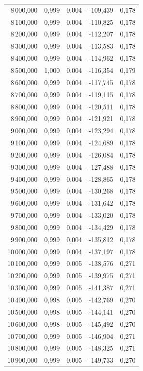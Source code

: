 \begin{longtable}{rrrrr}
8\,000,000 & 0,999 & 0,004 & -109,439 & 0,178\\
8\,100,000 & 0,999 & 0,004 & -110,825 & 0,178\\
8\,200,000 & 0,999 & 0,004 & -112,207 & 0,178\\
8\,300,000 & 0,999 & 0,004 & -113,583 & 0,178\\
8\,400,000 & 0,999 & 0,004 & -114,962 & 0,178\\
8\,500,000 & 1,000 & 0,004 & -116,354 & 0,179\\
8\,600,000 & 0,999 & 0,004 & -117,745 & 0,178\\
8\,700,000 & 0,999 & 0,004 & -119,115 & 0,178\\
8\,800,000 & 0,999 & 0,004 & -120,511 & 0,178\\
8\,900,000 & 0,999 & 0,004 & -121,921 & 0,178\\
9\,000,000 & 0,999 & 0,004 & -123,294 & 0,178\\
9\,100,000 & 0,999 & 0,004 & -124,689 & 0,178\\
9\,200,000 & 0,999 & 0,004 & -126,084 & 0,178\\
9\,300,000 & 0,999 & 0,004 & -127,488 & 0,178\\
9\,400,000 & 0,999 & 0,004 & -128,865 & 0,178\\
9\,500,000 & 0,999 & 0,004 & -130,268 & 0,178\\
9\,600,000 & 0,999 & 0,004 & -131,642 & 0,178\\
9\,700,000 & 0,999 & 0,004 & -133,020 & 0,178\\
9\,800,000 & 0,999 & 0,004 & -134,429 & 0,178\\
9\,900,000 & 0,999 & 0,004 & -135,812 & 0,178\\
10\,000,000 & 0,999 & 0,004 & -137,197 & 0,178\\
10\,100,000 & 0,999 & 0,005 & -138,576 & 0,271\\
10\,200,000 & 0,999 & 0,005 & -139,975 & 0,271\\
10\,300,000 & 0,999 & 0,005 & -141,387 & 0,271\\
10\,400,000 & 0,998 & 0,005 & -142,769 & 0,270\\
10\,500,000 & 0,998 & 0,005 & -144,141 & 0,270\\
10\,600,000 & 0,998 & 0,005 & -145,492 & 0,270\\
10\,700,000 & 0,999 & 0,005 & -146,904 & 0,271\\
10\,800,000 & 0,999 & 0,005 & -148,325 & 0,271\\
10\,900,000 & 0,999 & 0,005 & -149,733 & 0,270\\

\end{longtable}
